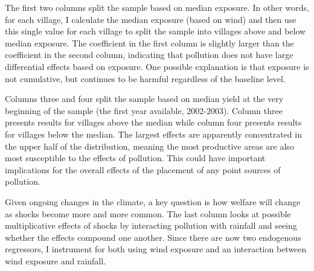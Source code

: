 \documentclass[
]{article}
\begin{document}
The first two columns split the sample based on median exposure. In other words, for each village, I calculate the median exposure (based on wind) and then use this single value for each village to split the sample into villages above and below median exposure. The coefficient in the first column is slightly larger than the coefficient in the second column, indicating that pollution does not have large differential effects based on exposure. One possible explanation is that exposure is not cumulative, but continues to be harmful regardless of the baseline level.

Columns three and four split the sample based on median yield at the very beginning of the sample (the first year available, 2002-2003). Column three presents results for villages above the median while column four presents results for villages below the median. The largest effects are apparently concentrated in the upper half of the distribution, meaning the most productive areas are also most susceptible to the effects of pollution. This could have important implications for the overall effects of the placement of any point sources of pollution.

Given ongoing changes in the climate, a key question is how welfare will change as shocks become more and more common. The last column looks at possible multiplicative effects of shocks by interacting pollution with rainfall and seeing whether the effects compound one another. Since there are now two endogenous regressors, I instrument for both using wind exposure and an interaction between wind exposure and rainfall.
\end{document}
